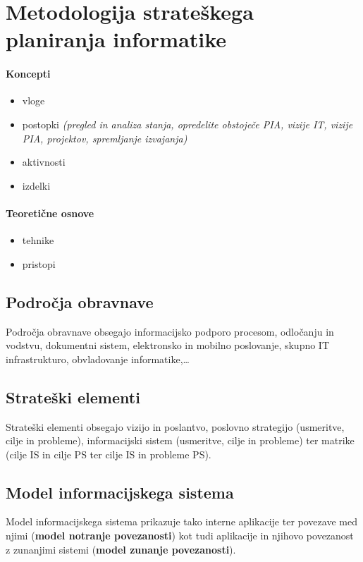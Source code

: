 \documentclass[a4paper,12pt]{report}
\begin{document}
   \section{Metodologija strateškega planiranja informatike}
      \paragraph{Koncepti}
         \begin{itemize}
            \item vloge
            \item postopki \emph{(pregled in analiza stanja, opredelite obstoječe PIA, vizije IT, vizije PIA, projektov, spremljanje izvajanja)}
            \item aktivnosti
            \item izdelki
         \end{itemize}
      \paragraph{Teoretične osnove}
         \begin{itemize}
            \item tehnike
            \item pristopi
         \end{itemize}

      \subsection{Področja obravnave}
         Področja obravnave obsegajo informacijsko podporo procesom, odločanju in vodstvu, dokumentni sistem, elektronsko in mobilno poslovanje, skupno IT infrastrukturo, obvladovanje informatike,\dots
      
      \subsection{Strateški elementi}
         Strateški elementi obsegajo vizijo in poslantvo, poslovno strategijo (usmeritve, cilje in probleme), informacijski sistem (usmeritve, cilje in probleme) ter matrike (cilje IS in cilje PS ter cilje IS in probleme PS).

      \subsection{Model informacijskega sistema}
         Model informacijskega sistema prikazuje tako interne aplikacije ter povezave med njimi (\textbf{model notranje povezanosti}) kot tudi aplikacije in njihovo povezanost z zunanjimi sistemi (\textbf{model zunanje povezanosti}).
\end{document}
